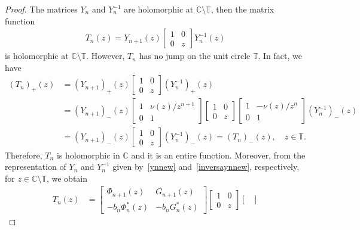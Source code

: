 \documentclass[12pt]{amsart}
\begin{document}
\begin{proof} The matrices \( Y_n \) and \( Y_n^{-1} \) are holomorphic at \( \mathbb{C}\setminus\mathbb{T} \), then
the matrix function
\begin{align*}
T_n(z)
=
Y_{n+1}(z)
 \begin{bmatrix}
1 & 0\\
0 & z
\end{bmatrix} 
Y_n^{-1}(z)
\end{align*}
 is holomorphic at \( \mathbb{C}\setminus\mathbb{T} \). 
However, \( T_n \) has no jump on the unit circle \( \mathbb{T} \). In fact, we have
\begin{align*}
 (T_n)_{+}(z) &=(Y_{n+1})_{+}(z)\begin{bmatrix}
1 & 0\\
0 & z
\end{bmatrix}(Y_n^{-1})_{+}(z)\\
 &= {(Y_{n+1})}_{-}(z)
\begin{bmatrix}
1 & \nu(z)/z^{n+1}\\
0 & 1
\end{bmatrix} \begin{bmatrix}
1 & 0\\
0 & z
\end{bmatrix}
\begin{bmatrix}
1 & -\nu(z)/z^{n}\\
0 & 1
\end{bmatrix} {(Y_{n}^{-1})}_{-}(z)\\
 &= {(Y_{n+1})}_{-}(z)
 \begin{bmatrix}
1 & 0\\
0 & z
\end{bmatrix}
 {(Y_{n}^{-1})}_{-}(z) = (T_n)_{-}(z), \quad z\in\mathbb{T}.
\end{align*}
Therefore, \( T_n \) is holomorphic in \( \mathbb{C} \) and it is an entire function.
Moreover, from the representation of \( Y_n \) and \( Y_n^{-1} \) given by~\eqref{ynnew} and~\eqref{inversaynnew}, respectively,
for \( z\in \mathbb C \setminus \mathbb{T} \), we obtain
\begin{align*}
 T_n(z) 
 &=\begin{bmatrix}
\Phi_{n+1}(z) & G_{n+1}(z) \\[.05cm]
-b_{n}\Phi^*_{n}(z) & -b_{n} G^*_{n}(z)
\end{bmatrix}
\begin{bmatrix}
1 & 0\\[.05cm]
0 & z
\end{bmatrix}
\begin{bmatrix}

\end{bmatrix}
\end{align*}
\end{proof}
\end{document}
